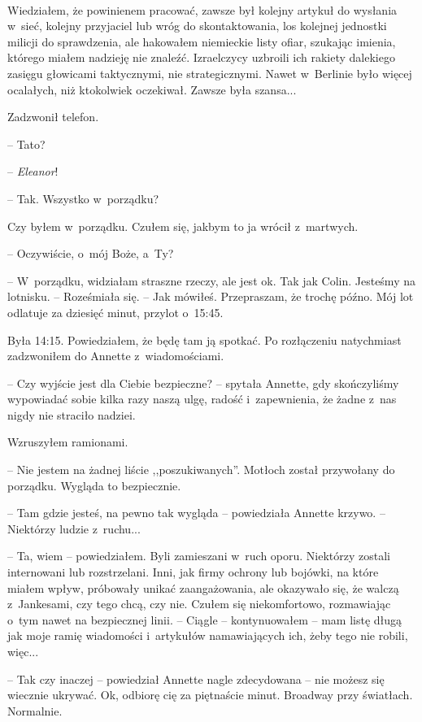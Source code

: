 \documentclass[oneside,polish,11pt,sfheadings]{mwbk}
\begin{document}
~

Wiedziałem, że powinienem pracować, zawsze był kolejny artykuł do
wysłania w~sieć, kolejny przyjaciel lub wróg do skontaktowania, los
kolejnej jednostki milicji do sprawdzenia, ale hakowałem niemieckie
listy ofiar, szukając imienia, którego miałem nadzieję nie znaleźć.
Izraelczycy uzbroili ich rakiety dalekiego zasięgu głowicami
taktycznymi, nie strategicznymi. Nawet w~Berlinie było więcej ocalałych,
niż ktokolwiek oczekiwał. Zawsze była szansa...

Zadzwonił telefon.

-- Tato?

-- \emph{Eleanor}!

-- Tak. Wszystko w~porządku?

Czy byłem w~porządku. Czułem się, jakbym to ja wrócił z~martwych.

-- Oczywiście, o~mój Boże, a~Ty?

-- W~porządku, widziałam straszne rzeczy, ale jest ok. Tak jak Colin.
Jesteśmy na lotnisku. -- Roześmiała się. -- Jak mówiłeś. Przepraszam, że
trochę późno. Mój lot odlatuje za dziesięć minut, przylot o~15:45.

Była 14:15. Powiedziałem, że będę tam ją spotkać. Po rozłączeniu
natychmiast zadzwoniłem do Annette z~wiadomościami.

-- Czy wyjście jest dla Ciebie bezpieczne? -- spytała Annette, gdy
skończyliśmy wypowiadać sobie kilka razy naszą ulgę, radość i~zapewnienia, że żadne z~nas nigdy nie straciło nadziei.

Wzruszyłem ramionami. 

-- Nie jestem na żadnej liście ,,poszukiwanych''.
Motłoch został przywołany do porządku. Wygląda to bezpiecznie.

-- Tam gdzie jesteś, na pewno tak wygląda -- powiedziała Annette krzywo. -- Niektórzy ludzie z~ruchu...

-- Ta, wiem -- powiedziałem. Byli zamieszani w~ruch oporu. Niektórzy
zostali internowani lub rozstrzelani. Inni, jak firmy ochrony lub
bojówki, na które miałem wpływ, próbowały unikać zaangażowania, ale
okazywało się, że walczą z~Jankesami, czy tego chcą, czy nie. Czułem się
niekomfortowo, rozmawiając o~tym nawet na bezpiecznej linii. -- Ciągle
-- kontynuowałem -- mam listę długą jak moje ramię wiadomości i~artykułów
namawiających ich, żeby tego nie robili, więc...

-- Tak czy inaczej -- powiedział Annette nagle zdecydowana -- nie możesz
się wiecznie ukrywać. Ok, odbiorę cię za piętnaście minut. Broadway przy
światłach. Normalnie.
\end{document}

